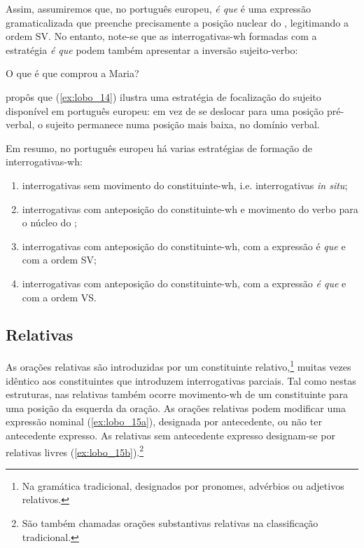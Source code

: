\documentclass[output=paper]{LSP/langsci}
\begin{document}
\z

Assim, assumiremos que, no português europeu, \textit{é que} é uma expressão gramaticalizada que preenche precisamente a posição nuclear do , legitimando a ordem SV. No entanto, note-se que as interrogativas-wh formadas com a estratégia \textit{é que} podem também apresentar a inversão sujeito-verbo:

\ea\label{ex:lobo_14} O que é que comprou a Maria?\z

\citet{soares2006} propôs que (\ref{ex:lobo_14}) ilustra uma estratégia de focalização do sujeito disponível em português europeu: em vez de se deslocar para uma posição pré-verbal, o sujeito permanece numa posição mais baixa, no domínio verbal. 

Em resumo, no português europeu há varias estratégias de formação de in\-ter\-ro\-ga\-ti\-vas-wh:

\begin{enumerate}[label=\roman*)]
\item interrogativas sem movimento do constituinte-wh, i.e. interrogativas \textit{in situ};
\item interrogativas com anteposição do constituinte-wh e movimento do verbo para o núcleo do ;
\item interrogativas com anteposição do constituinte-wh, com a expressão é\textit{ que} e com a ordem SV;
\item interrogativas com anteposição do constituinte-wh, com a expressão \textit{é que} e com a ordem VS.
\end{enumerate}

\subsection{Relativas}
\label{subsec:lobo_relativas}

As orações relativas são introduzidas por um constituinte relativo,\footnote{Na gramática tradicional, designados por pronomes, advérbios ou adjetivos relativos.
} muitas vezes idêntico aos constituintes que introduzem interrogativas parciais. Tal como nestas estruturas, nas relativas também ocorre movimento-wh de um constituinte para uma posição da  esquerda da oração. As orações relativas podem modificar uma expressão nominal (\ref{ex:lobo_15a}), designada por antecedente, ou não ter antecedente expresso. As relativas sem antecedente expresso designam-se por relativas livres (\ref{ex:lobo_15b}).\footnote{São também chamadas orações substantivas relativas na classificação tradicional.}
\end{document}
